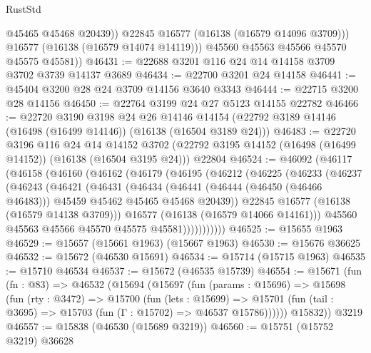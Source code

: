 \begin{lexlean}{RustStd}
\begin{coremodule}
                @45465
                @45468
                @20439))
            @22845
            @16577
            (@16138 (@16579 @14096 @3709)))
          @16577
          (@16138 (@16579 @14074 @14119)))
        @45560
        @45563
        @45566
        @45570
        @45575
        @45581))
@46431 := @22688 @3201 @116 @24 @14 @14158 @3709 @3702 @3739 @14137 @3689
@46434 := @22700 @3201 @24 @14158
@46441 := @45404 @3200 @28 @24 @3709 @14156 @3640 @3343
@46444 := @22715 @3200 @28 @14156
@46450 := @22764 @3199 @24 @27 @5123 @14155 @22782
@46466 := @22720
    @3190
    @3198
    @24
    @26
    @14146
    @14154
    (@22792 @3189 @14146 (@16498 (@16499 @14146)) (@16138 (@16504 @3189 @24)))
@46483 := @22720
    @3196
    @116
    @24
    @14
    @14152
    @3702
    (@22792 @3195 @14152 (@16498 (@16499 @14152)) (@16138 (@16504 @3195 @24)))
    @22804
@46524 := @46092
    (@46117
      (@46158
        (@46160
          (@46162
            (@46179
              (@46195
                (@46212
                  (@46225
                    (@46233
                      (@46237
                        (@46243
                          (@46421
                            (@46431
                              (@46434
                                (@46441
                                  (@46444 (@46450 (@46466 @46483)))
                                  @45459
                                  @45462
                                  @45465
                                  @45468
                                  @20439))
                              @22845
                              @16577
                              (@16138 (@16579 @14138 @3709)))
                            @16577
                            (@16138 (@16579 @14066 @14161)))
                          @45560
                          @45563
                          @45566
                          @45570
                          @45575
                          @45581)))))))))))
@46525 := @15655 @1963
@46529 := @15657 (@15661 @1963) (@15667 @1963)
@46530 := @15676 @36625
@46532 := @15672 (@46530 @15691)
@46534 := @15714 (@15715 @1963)
@46535 := @15710 @46534
@46537 := @15672 (@46535 @15739)
@46554 := @15671
    (fun (fn : @83) =>
    @46532
      (@15694
        (@15697
          (fun (params : @15696) =>
          @15698
            (fun (rty : @3472) =>
            @15700
              (fun (lets : @15699) =>
              @15701 (fun (tail : @3695) => @15703 (fun (Γ : @15702) => @46537 @15786))))))
        @15832))
    @3219
@46557 := @15838 (@46530 (@15689 @3219))
@46560 := @15751 (@15752 @3219) @36628

\end{coremodule}
\end{lexlean}
